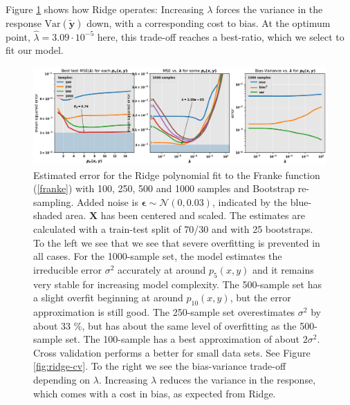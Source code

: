 \documentclass[]{article}
\begin{document}
Figure \ref{fig:ridge-bootstrap} shows how Ridge operates: Increasing $\lambda$ forces the variance in the response $\mathrm{Var}(\mathbf{\tilde{y}})$ down, with a corresponding cost to bias. At the optimum point, $\hat{\lambda} = 3.09 \cdot 10^{-5}$ here, this trade-off reaches a best-ratio, which we select to fit our model.

\begin{figure}[!htb]
	\centering
	\includegraphics[width=1\linewidth]{./results/ridge-bootstrap.png}
	\caption{Estimated error for the Ridge polynomial fit to the Franke function (\ref{franke}) with 100, 250, 500 and 1000 samples and Bootstrap re-sampling. Added noise is $\mathbf{\epsilon} \sim \mathcal{N}(0, 0.03)$, indicated by the blue-shaded area. $\mathbf{X}$ has been centered and scaled. The estimates are calculated with a train-test split of 70/30 and with 25 bootstraps. To the left we see that we see that severe overfitting is prevented in all cases. For the 1000-sample set, the model estimates the irreducible error $\sigma^2$ accurately at around $p_5(x,y)$ and it remains very stable for increasing model complexity. The 500-sample set has a slight overfit beginning at around $p_{10}(x,y)$, but the error approximation is still good. The 250-sample set overestimates $\sigma^2$ by about 33 \%, but has about the same level of overfitting as the 500-sample set. The 100-sample has a best approximation of about $2\sigma^2$. Cross validation performs a better for small data sets. See Figure \ref{fig:ridge-cv}. To the right we see the bias-variance trade-off depending on $\lambda$. Increasing $\lambda$ reduces the variance in the response, which comes with a cost in bias, as expected from Ridge.}
	\label{fig:ridge-bootstrap}
\end{figure}
\end{document}
